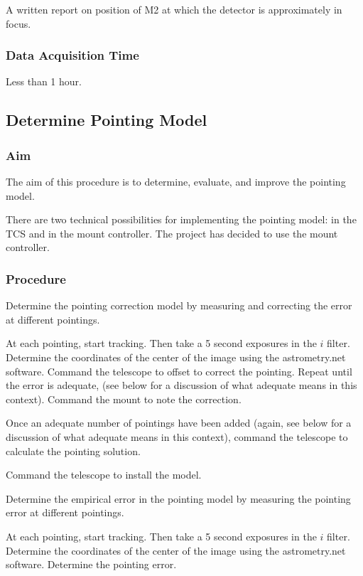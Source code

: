 \documentclass{article}
\begin{document}
A written report on position of M2 at which the detector is approximately in focus.

\subsubsection{Data Acquisition Time}

Less than 1 hour.


\subsection{Determine Pointing Model}

\subsubsection{Aim}

The aim of this procedure is to determine, evaluate, and improve the pointing model.

There are two technical possibilities for implementing the pointing model: in the TCS and in the mount controller. The project has decided to use the mount controller.

\subsubsection{Procedure}

Determine the pointing correction model by measuring and correcting the error at different pointings. 

At each pointing, start tracking. Then take a 5 second exposures in the $i$ filter. Determine the coordinates of the center of the image using the astrometry.net software. Command the telescope to offset to correct the pointing. Repeat until the error is adequate, (see below for a discussion of what adequate means in this context). Command the mount to note the correction. 

Once an adequate number of pointings have been added (again, see below for a discussion of what adequate means in this context), command the telescope to calculate the pointing solution.

Command the telescope to install the model.

Determine the empirical error in the pointing model by measuring the pointing error at different pointings.

At each pointing, start tracking. Then take a 5 second exposures in the $i$ filter. Determine the coordinates of the center of the image using the astrometry.net software. Determine the pointing error. 
\end{document}
